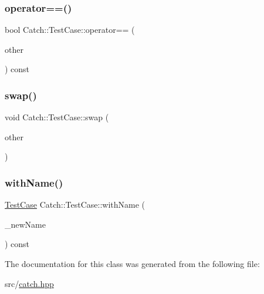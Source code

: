 \subsubsection{\texorpdfstring{operator==()}{operator==()}}
{\footnotesize\ttfamily bool Catch\+::\+Test\+Case\+::operator== (\begin{DoxyParamCaption}\item[{\hyperlink{class_catch_1_1_test_case}{Test\+Case} const \&}]{other }\end{DoxyParamCaption}) const}

\mbox{\label{class_catch_1_1_test_case_aee38f908faf10b905b209ca388275413}} 
\subsubsection{\texorpdfstring{swap()}{swap()}}
{\footnotesize\ttfamily void Catch\+::\+Test\+Case\+::swap (\begin{DoxyParamCaption}\item[{\hyperlink{class_catch_1_1_test_case}{Test\+Case} \&}]{other }\end{DoxyParamCaption})}

\mbox{\label{class_catch_1_1_test_case_a0812e8a216d09b087d5874687009f0d6}} 
\subsubsection{\texorpdfstring{with\+Name()}{withName()}}
{\footnotesize\ttfamily \hyperlink{class_catch_1_1_test_case}{Test\+Case} Catch\+::\+Test\+Case\+::with\+Name (\begin{DoxyParamCaption}\item[{\textbf{ std\+::string} const \&}]{\+\_\+new\+Name }\end{DoxyParamCaption}) const}



The documentation for this class was generated from the following file\+:\begin{DoxyCompactItemize}
\item 
src/\hyperlink{catch_8hpp}{catch.\+hpp}\end{DoxyCompactItemize}
